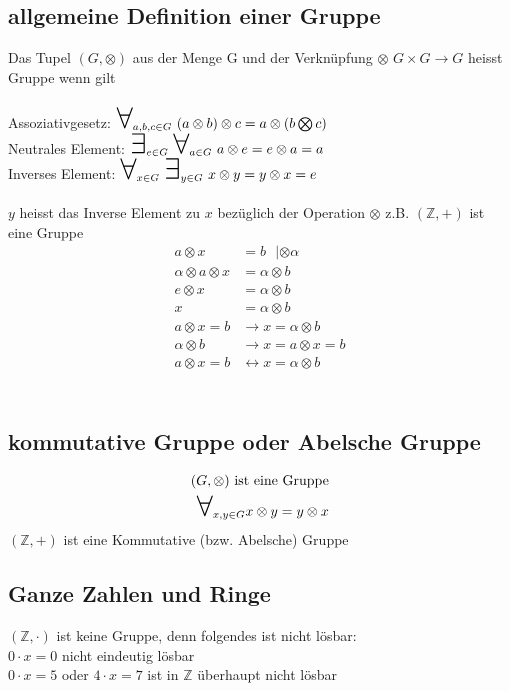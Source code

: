 \documentclass[a4paper]{scrartcl}
\newcommand\bigforall{\mbox{\huge $\forall$}}
\newcommand\bigexists{\mbox{\huge $\exists$}}
\begin{document}
\subsection{allgemeine Definition einer Gruppe}
Das Tupel $(G, \otimes)$ aus der Menge G und der Verknüpfung $\otimes$ 
$G \times G \rightarrow G$ heisst Gruppe wenn gilt \\ \\
Assoziativgesetz: $\bigforall_{a,b,c \in G}  \ (a \otimes b) \otimes c= a \otimes (b \bigotimes c) $\\
Neutrales Element: $\bigexists _{e \in G} \ \bigforall_{a \in G} \ a \otimes e = e \otimes a = a $ \\
Inverses Element: $\bigforall_{x \in G} \ \bigexists_{y \in G} \ x \otimes y= y \otimes x = e $ \\ \\
$y$ heisst das Inverse Element zu $x$ bezüglich der Operation $\otimes$ z.B. $(\mathbb{Z},+)$ ist eine Gruppe \\
\begin{align}
a \otimes x &= b \ \ \ | \otimes \alpha \\
\alpha \otimes a \otimes x &= \alpha \otimes b \\
e \otimes x &= \alpha \otimes b \\
x &= \alpha \otimes b \\
a \otimes x = b &\rightarrow x = \alpha \otimes b \\
\alpha \otimes b &\rightarrow x = a \otimes x = b \\
a \otimes x = b &\leftrightarrow x = \alpha \otimes b \\
\end{align} \\
\subsection{kommutative Gruppe oder Abelsche Gruppe}
\begin{align}
(G, \otimes) \text{ ist eine Gruppe} \\
\bigforall_{x,y \in G} x \otimes y = y \otimes x
\end{align}
$(\mathbb{Z},+)$ ist eine Kommutative (bzw. Abelsche) Gruppe
\subsection{Ganze Zahlen und Ringe}
$(\mathbb{Z}, \cdot)$ ist keine Gruppe, denn folgendes ist nicht lösbar: \\
$0 \cdot x = 0$ nicht eindeutig lösbar \\
$0 \cdot x = 5$ oder $4 \cdot x = 7$ ist in $\mathbb{Z}$ überhaupt nicht lösbar \\ \\
\end{document}

